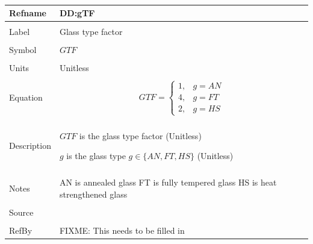 \documentclass[12pt]{article}
\begin{document}
~\newline
\noindent \begin{minipage}{\textwidth}
\begin{tabular}{p{} p{}}
\toprule \textbf{Refname} & \textbf{DD:gTF}
\label{DD:gTF}
\\ \midrule \\
Label & Glass type factor
\\ \midrule \\
Symbol & $GTF$
\\ \midrule \\
Units & Unitless
\\ \midrule \\
Equation & \begin{dmath}
           GTF=\begin{cases}
1, & g=AN\\
4, & g=FT\\
2, & g=HS
\end{cases}
           \end{dmath}
\\ \midrule \\
Description & \begin{symbDescription}
              \item{$GTF$ is the glass type factor (Unitless)}
              \item{$g$ is the glass type $g\in{}\{AN,FT,HS\}$ (Unitless)}
              \end{symbDescription}
\\ \midrule \\
Notes & AN is annealed glass
        FT is fully tempered glass
        HS is heat strengthened glass
\\ \midrule \\
Source & \cite{astm2009}
\\ \midrule \\
RefBy & FIXME: This needs to be filled in
\\ \bottomrule \end{tabular}
\end{minipage}\\
~\newline
\end{document}
